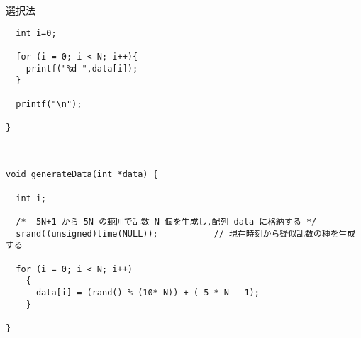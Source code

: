 \documentclass[a4j,titlepage]{jarticle}
\begin{document}
\begin{breakitembox}[l]{選択法}
\begin{verbatim}
  int i=0;

  for (i = 0; i < N; i++){
    printf("%d ",data[i]);
  }

  printf("\n");

}



void generateData(int *data) {

  int i; 
  
  /* -5N+1 から 5N の範囲で乱数 N 個を生成し,配列 data に格納する */
  srand((unsigned)time(NULL));           // 現在時刻から疑似乱数の種を生成する
  
  for (i = 0; i < N; i++)
    {
      data[i] = (rand() % (10* N)) + (-5 * N - 1);
    }

}
\end{verbatim}
\end{breakitembox}
\end{document}
